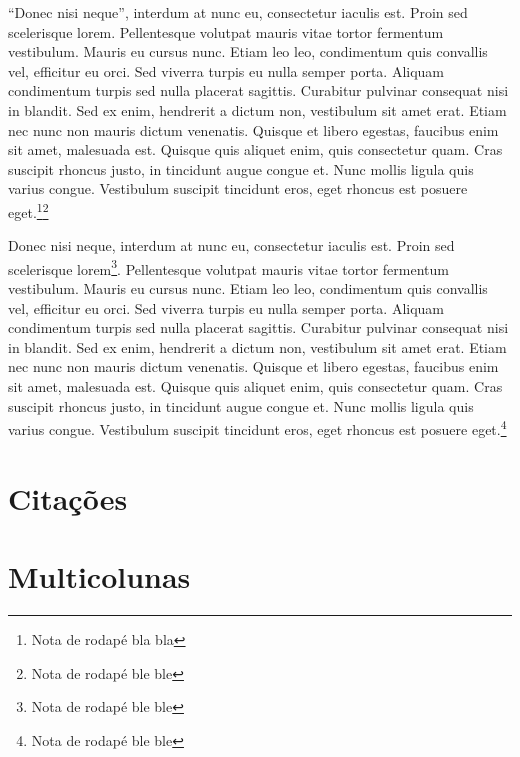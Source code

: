\documentclass[12pt]{article}
\begin{document}
\enquote{Donec nisi neque}, interdum at nunc eu, consectetur iaculis est. Proin sed scelerisque lorem. Pellentesque volutpat mauris vitae tortor fermentum vestibulum. Mauris eu cursus nunc. Etiam leo leo, condimentum quis convallis vel, efficitur eu orci. Sed viverra turpis eu nulla semper porta. Aliquam condimentum turpis sed nulla placerat sagittis. Curabitur pulvinar consequat nisi in blandit. Sed ex enim, hendrerit a dictum non, vestibulum sit amet erat. Etiam nec nunc non mauris dictum venenatis. Quisque et libero egestas, faucibus enim sit amet, malesuada est. Quisque quis aliquet enim, quis consectetur quam. Cras suscipit rhoncus justo, in tincidunt augue congue et. Nunc mollis ligula quis varius congue. Vestibulum suscipit tincidunt eros, eget rhoncus est posuere eget.\footnote{Nota de rodapé bla bla}\footnote{Nota de rodapé ble ble}

Donec nisi neque, interdum at nunc eu, consectetur iaculis est. Proin sed scelerisque lorem\footnote[999]{Nota de rodapé ble ble}. Pellentesque volutpat mauris vitae tortor fermentum vestibulum. Mauris eu cursus nunc. Etiam leo leo, condimentum quis convallis vel, efficitur eu orci. Sed viverra turpis eu nulla semper porta. Aliquam condimentum turpis sed nulla placerat sagittis. Curabitur pulvinar consequat nisi in blandit. Sed ex enim, hendrerit a dictum non, vestibulum sit amet erat. Etiam nec nunc non mauris dictum venenatis. Quisque et libero egestas, faucibus enim sit amet, malesuada est. Quisque quis aliquet enim, quis consectetur quam. Cras suscipit rhoncus justo, in tincidunt augue congue et. Nunc mollis ligula quis varius congue. Vestibulum suscipit tincidunt eros, eget rhoncus est posuere eget.\footnote{Nota de rodapé ble ble}

\section{Citações}



\section{Multicolunas}
\end{document}
